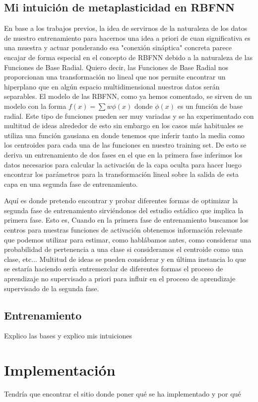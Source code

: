 \documentclass[10pt,a4paper, twocolumn]{report}
\begin{document}
\section{Mi intuición de metaplasticidad en RBFNN}
En base a los trabajos previos, la idea de servirnos de la naturaleza de los datos de nuestro entrenamiento para hacernos una idea a priori de cuan significativa es una muestra y actuar ponderando esa "conexión sináptica" concreta parece encajar de forma especial en el concepto de RBFNN debido a la naturaleza de las Funciones de Base Radial. Quiero decir, las Funciones de Base Radial nos proporcionan una transformación no lineal que nos permite encontrar un hiperplano que en algún espacio multidimensional nuestros datos serán separables. El modelo de las RBFNN, como ya hemos comentado, se sirven de un modelo con la forma $f(x)=\sum w \phi(x)$ donde $\phi(x)$ es un función de base radial. Este tipo de funciones pueden ser muy variadas y se ha experimentado con multitud de ideas alrededor de esto sin embargo en los casos más habituales se utiliza una función gausiana en donde tenemos que inferir tanto la media como los centroides para cada una de las funciones en nuestro training set. De esto se deriva un entrenamiento de dos fases en el que en la primera fase inferimos los datos necesarios para calcular la activación de la capa oculta para hacer luego encontrar los parámetros para la transformación lineal sobre la salida de esta capa en una segunda fase de entrenamiento.

Aquí es donde pretendo encontrar y probar diferentes formas de optimizar la segunda fase de entrenamiento sirviéndonos del estudio estádico que implica la primera fase. Esto es, Cuando en la primera fase de entrenamiento buscamos los centros para nuestras funciones de activación obtenemos información relevante que podemos utilizar para estimar, como hablábamos antes, como considerar una probabilidad de pertenencia a una clase si consideramos el centroide como una clase, etc... Multitud de ideas se pueden considerar y en última instancia lo que se estaría haciendo sería entremezclar de diferentes formas el proceso de aprendizaje no supervisado a priori para influir en el proceso de aprendizaje supervisado de la segunda fase.

\section{Entrenamiento}
Explico las bases y explico mis intuiciones
\chapter{Implementación}
Tendría que encontrar el sitio donde poner qué se ha implementado y por qué
\end{document}
